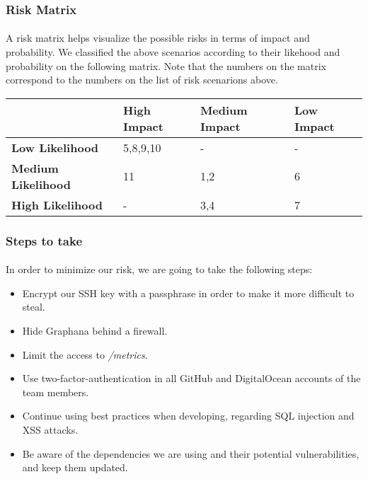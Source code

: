 \subsubsection{Risk Matrix}
\paragraph{} A risk matrix helps visualize the possible risks in terms of impact and probability. We classified the above scenarios according to their likehood and probability on the following matrix. Note that the numbers on the matrix correspond to the numbers on the list of risk scenarions above. \\
\begin{tabular}{|l|l|l|l|}
	\hline
	& \textbf{High Impact} & \textbf{Medium Impact} & \textbf{Low Impact} \\ \hline
	\textbf{Low Likelihood} & 5,8,9,10 & - & - \\ \hline
	\textbf{Medium Likelihood} & 11 & 1,2 & 6 \\ \hline
	\textbf{High Likelihood} & - & 3,4 & 7 \\ \hline
\end{tabular}

\subsubsection{Steps to take}
\paragraph{} In order to minimize our risk, we are going to take the following steps:
\begin{itemize}
	\item Encrypt our SSH key with a passphrase in order to make it more difficult to steal.
	\item Hide Graphana behind a firewall.
	\item Limit the access to \textit{/metrics}.
	\item Use two-factor-authentication in all GitHub and DigitalOcean accounts of the team members.
	\item Continue using best practices when developing, regarding SQL injection and XSS attacks.
	\item Be aware of the dependencies we are using and their potential vulnerabilities, and keep them updated.
\end{itemize}

